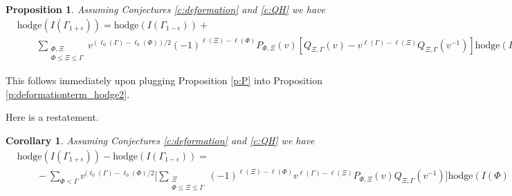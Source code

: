 \documentclass[12pt,leqno]{article}
\newtheorem{corollary}[equation]{Corollary}
\newtheorem{proposition}[equation]{Proposition}
\newcommand{\hodge}{\text{hodge}}
\newcommand\inv{^{-1}}
\begin{document}
\begin{proposition}
Assuming Conjectures \ref{c:deformation} and  \ref{c:QH}  we have
\normalfont
$$
\begin{aligned}
&
\hodge(I(\Gamma_{1+\epsilon}))=\hodge(I(\Gamma_{1-\epsilon}))+\\
&\qquad\sum_{\substack{\Phi,\Xi\\\Phi\le\Xi\le\Gamma}}
v^{(\ell_0(\Gamma)-\ell_0(\Phi))/2}(-1)^{\ell(\Xi)-\ell(\Phi)}P_{\Phi,\Xi}(v)[Q_{\Xi,\Gamma}(v)-v^{\ell(\Gamma)-\ell(\Xi)}Q_{\Xi,\Gamma}(v\inv)]\hodge(I(\Phi))
\end{aligned}
$$
\end{proposition}

This follows immediately upon plugging Proposition  \ref{p:P} into
Proposition \ref{p:deformationterm_hodge2}.






Here is a restatement.

\begin{corollary}
\label{c:deformationformula}
Assuming Conjectures \ref{c:deformation} and  \ref{c:QH}  we have
\normalfont
$$
\begin{aligned}
&
\hodge(I(\Gamma_{1+\epsilon}))-\hodge(I(\Gamma_{1-\epsilon}))=\\
&\qquad
-\sum_{\Phi<\Gamma}
v^{(\ell_0(\Gamma)-\ell_0(\Phi)/2}\bigg[\sum_{\substack{\Xi\\\Phi\le\Xi\le\Gamma}}
(-1)^{\ell(\Xi)-\ell(\Phi)}
v^{\ell(\Gamma)-\ell(\Xi)}P_{\Phi,\Xi}(v)Q_{\Xi,\Gamma}(v\inv)\bigg]
\hodge(I(\Phi))
\end{aligned}
$$
\end{corollary}
\end{document}
